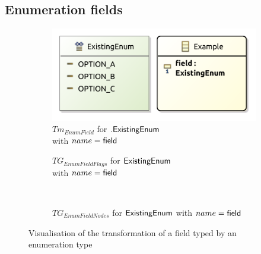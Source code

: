 \subsection{Enumeration fields}
\label{subsec:library_of_transformations:type_level_transformations:enum_fields}

\begin{figure}
    \centering
    \begin{subfigure}{0.45\textwidth}
        \centering
        \includegraphics{images/05_library_of_transformations/02_type_level_transformations/07_enum_fields/enum_field.pdf}
        \caption{$Tm_{EnumField}$ for $.\mathsf{ExistingEnum}$ \\with $name = \mathsf{field}$}
        \label{fig:library_of_transformations:type_level_transformations:enum_fields:visualisation:ecore}
    \end{subfigure}
    \begin{subfigure}{0.45\textwidth}
        \centering
        
        \caption{$TG_{EnumFieldFlags}$ for $\mathsf{ExistingEnum}$ \\with $name = \mathsf{field}$}
        \label{fig:library_of_transformations:type_level_transformations:enum_fields:visualisation:groove_flags}
    \end{subfigure}
    \\
    \begin{subfigure}{0.95\textwidth}
        \centering
        
        \caption{$TG_{EnumFieldNodes}$ for $\mathsf{ExistingEnum}$ with $name = \mathsf{field}$}
        \label{fig:library_of_transformations:type_level_transformations:enum_fields:visualisation:groove_nodes}
    \end{subfigure}
    \caption{Visualisation of the transformation of a field typed by an enumeration type}
    \label{fig:library_of_transformations:type_level_transformations:enum_fields:visualisation}
\end{figure}

